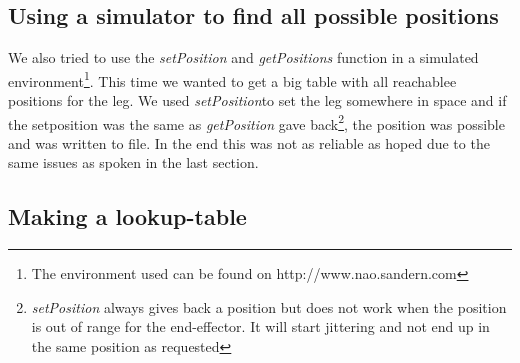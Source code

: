\documentclass[a4paper]{article}
\begin{document}
\subsection{Using a simulator to find all possible positions}
We also tried to use the \emph{setPosition} and \emph{getPositions} function in
a simulated environment\footnote{The environment used can be found on
http://www.nao.sandern.com}. This time we wanted to get a big table with all
reachablee positions for the leg. We used \emph{setPosition}to set the leg
somewhere in space and if the setposition was the same as \emph{getPosition}
gave back\footnote{\emph{setPosition} always gives back a position but does not
work when the position is out of range for the end-effector. It will start
jittering and not end up in the same position as requested}, the position was possible and was written to file.
In the end this was not as reliable as hoped due to the same issues as spoken in
the last section.

\subsection{Making a lookup-table}



\end{document}
